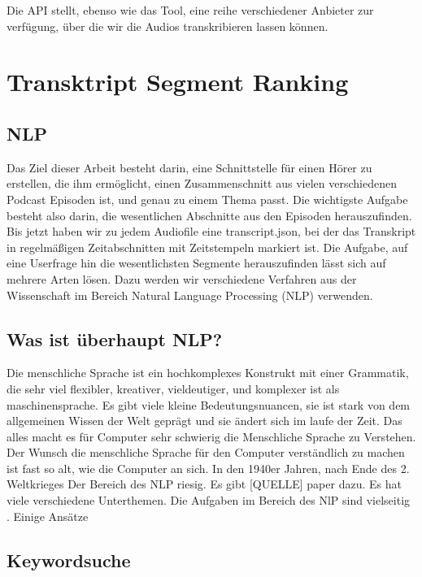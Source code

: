Die API stellt, ebenso wie das Tool, eine reihe verschiedener Anbieter zur verfügung, über die wir die Audios transkribieren lassen können. 



\section{Transktript Segment Ranking}

\subsection{NLP}

Das Ziel dieser Arbeit besteht darin, eine Schnittstelle für einen Hörer zu erstellen, die ihm ermöglicht, einen Zusammenschnitt aus vielen verschiedenen Podcast Episoden ist, und genau zu einem Thema passt. 
Die wichtigste Aufgabe besteht also darin, die wesentlichen Abschnitte aus den Episoden herauszufinden. 
Bis jetzt haben wir zu jedem Audiofile eine transcript.json, bei der das Transkript in regelmäßigen Zeitabschnitten mit Zeitstempeln markiert ist. 
Die Aufgabe, auf eine Userfrage hin die wesentlichsten Segmente herauszufinden lässt sich auf mehrere Arten lösen. 
Dazu werden wir verschiedene Verfahren aus der Wissenschaft im Bereich Natural Language Processing (NLP) verwenden.

\subsection{Was ist überhaupt NLP?}

Die menschliche Sprache ist ein hochkomplexes Konstrukt mit einer Grammatik, die sehr viel flexibler, kreativer, vieldeutiger, und komplexer ist als maschinensprache. 
Es gibt viele kleine Bedeutungsnuancen, sie ist stark von dem allgemeinen Wissen der Welt geprägt und sie ändert sich im laufe der Zeit. 
Das alles macht es für Computer sehr schwierig die Menschliche Sprache zu Verstehen. 
Der Wunsch die menschliche Sprache für den Computer verständlich zu machen ist fast so alt, wie die Computer an sich. 
In den 1940er Jahren, nach Ende des 2. Weltkrieges 
Der Bereich des NLP riesig. 
Es gibt [QUELLE] paper dazu. 
Es hat viele verschiedene Unterthemen. 
Die Aufgaben im Bereich des NlP sind vielseitig . Einige Ansätze 

\subsection{Keywordsuche}



